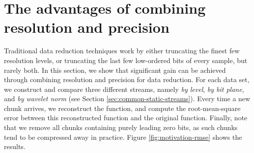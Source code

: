 \section{The advantages of combining resolution and precision}
\label{sec:motivation}

Traditional data reduction techniques work by either truncating the finest few resolution levels, or
truncating the last few low-ordered bits of every sample, but rarely both. In this section, we show
that significant gain can be achieved through combining resolution and precision for data reduction.
For each data set, we construct and compare three different streams, namely \emph{by level},
\emph{by bit plane}, and \emph{by wavelet norm} (see Section \ref{sec:common-static-streams}). Every
time a new chunk arrives, we reconstruct the function, and compute the root-mean-square error
between this reconstructed function and the original function. Finally, note that we remove all
chunks containing purely leading zero bits, as such chunks tend to be compressed away in practice.
Figure \ref{fig:motivation-rmse} shows the results.

